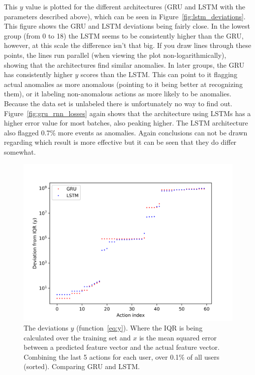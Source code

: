 This \(y\) value is plotted for the different architectures (GRU and LSTM with the parameters described above), which can be seen in Figure~\ref{fig:lstm_deviations}. This figure shows the GRU and LSTM deviations being fairly close. In the lowest group (from 0 to 18) the LSTM seems to be consistently higher than the GRU, however, at this scale the difference isn't that big. If you draw lines through these points, the lines run parallel (when viewing the plot non-logarithmically), showing that the architectures find similar anomalies. In later groups, the GRU has consistently higher \(y\) scores than the LSTM. This can point to it flagging actual anomalies as more anomalous (pointing to it being better at recognizing them), or it labeling non-anomalous actions as more likely to be anomalies. Because the data set is unlabeled there is unfortunately no way to find out. Figure~\ref{fig:gru_rnn_losses} again shows that the architecture using LSTMs has a higher error value for most batches, also peaking higher. The LSTM architecture also flagged 0.7\% more events as anomalies. Again conclusions can not be drawn regarding which result is more effective but it can be seen that they do differ somewhat.

\begin{figure}
	\begin{center}
		\includegraphics[scale=0.8]{experiments/cell/deviations/gru_vs_lstm}
	\end{center}
	\caption{The deviations \(y\) (function~\ref{eq:y}). Where the IQR is being calculated over the training set and \(x\) is the mean squared error between a predicted feature vector and the actual feature vector. Combining the last 5 actions for each user, over 0.1\% of all users (sorted). Comparing GRU and LSTM.~\label{fig:gru_vs_lstm}}
\end{figure}

